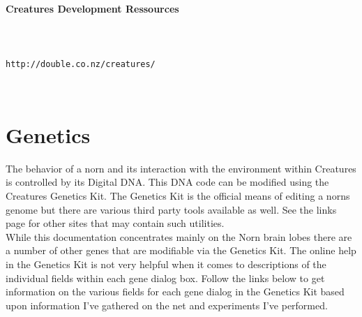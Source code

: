 \documentclass[11pt,twoside,a4paper]{article}
\def\MainTitle{Creatures Development Ressources}
\begin{document}
\setlength\parindent{0pt}

\vfill

\begin{center}
	\textbf{\Large \MainTitle }~\\
	~\\ ~\\ ~\\
	\texttt{http://double.co.nz/creatures/}~\\
\end{center}

\tableofcontents

\listoftables


\listoffigures

\vfill

~\\

\clearpage


\section{Genetics} %

The behavior of a norn and its interaction with the environment within Creatures is controlled by its Digital DNA. This DNA code can be modified using the Creatures Genetics Kit. The Genetics Kit is the official means of editing a norns genome but there are various third party tools available as well. See the links page for other sites that may contain such utilities.~\\

While this documentation concentrates mainly on the Norn brain lobes there are a number of other genes that are modifiable via the Genetics Kit. The online help in the Genetics Kit is not very helpful when it comes to descriptions of the individual fields within each gene dialog box. Follow the links below to get information on the various fields for each gene dialog in the Genetics Kit based upon information I've gathered on the net and experiments I've performed.~\\
\end{document}
